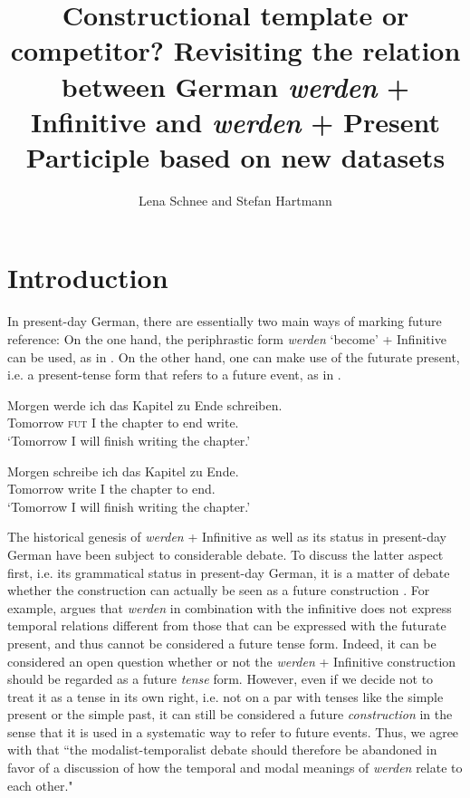 \documentclass[output=paper,colorlinks,citecolor=brown]{langscibook}
\author{Lena Schnee\orcid{}\affiliation{Heinrich-Heine-Universität Düsseldorf; Universität Hamburg} and
        Stefan Hartmann\orcid{}\affiliation{Heinrich-Heine-Universität Düsseldorf}}
\title[{\textit{werden} + Infinitive and \textit{werden} + Present Participle}]{Constructional template or competitor? Revisiting the relation between German \textit{werden} + Infinitive and \textit{werden} + Present Participle based on new datasets}
\begin{document}
\maketitle


\section{Introduction} \label{sec:hs:intro}

In present-day German, there are essentially two main ways of marking future reference: On the one hand, the periphrastic form \textit{werden} `become' + Infinitive can be used, as in . On the other hand, one can make use of the futurate present, i.e. a present-tense form that refers to a future event, as in .

\ea
    \label{ex:hs:futur}
    \ea \label{ex:hs:futurwerden}
    \gll Morgen werde ich das Kapitel zu Ende schreiben. \\
    Tomorrow \textsc{fut} I the chapter to end write. \\
    \glt `Tomorrow I will finish writing the chapter.'

    \ex \label{ex:hs:futuratepresent}
    \gll Morgen schreibe ich das Kapitel zu Ende. \\
    Tomorrow write I the chapter to end. \\
    \glt `Tomorrow I will finish writing the chapter.'
    \z
    \z

The historical genesis of \textit{werden} + Infinitive as well as its status in present-day German have been subject to considerable debate. To discuss the latter aspect first, i.e. its grammatical status in present-day German, it is a matter of debate whether the construction can actually be seen as a future construction \citep[e.g.][]{saltveitBesitztDeutscheSprache1960, vater1975}. For example, \citet{vater1975} argues that \textit{werden} in combination with the infinitive does not express temporal relations different from those that can be expressed with the futurate present, and thus cannot be considered a future tense form. Indeed, it can be considered an open question whether or not the \textit{werden} + Infinitive construction should be regarded as a future \textit{tense} form. However, even if we decide not to treat it as a tense in its own right, i.e. not on a par with tenses like the simple present or the simple past, it can still be considered a future \textit{construction} in the sense that it is used in a systematic way to refer to future events. Thus, we agree with \citet[154]{Hilpert2008} that ``the modalist-temporalist debate should therefore be abandoned in favor of a discussion of how the temporal and modal meanings of \textit{werden} relate to each other."
\end{document}
